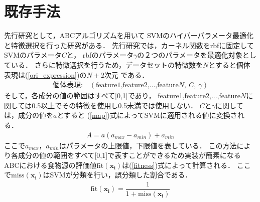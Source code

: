 \section{既存手法}
先行研究として，ABCアルゴリズムを用いて
SVMのハイパーパラメータ最適化と特徴選択を行った研究がある\cite{origin}．
先行研究では，カーネル関数をrbfに固定してSVMのパラメータ$C$と，
rbfのパラメータ$\gamma$の２つのパラメータを最適化対象としている．
さらに特徴選択を行うため，データセットの特徴数を$N$とすると個体表現は(\ref{ori_expression})の$N+2$次元
である．
\begin{align}
  \text{個体表現:} \quad  (\text{feature1,feature2,...,feature}N,~C,~\gamma)\label{ori_expression}
\end{align}
そして，各成分の値の範囲はすべて[0,1]であり，
feature1,feature2,...,feature$N$に関しては0.5以上でその特徴を使用し0.5未満では使用しない．
$C$と$\gamma$に関しては，成分の値を$a$とすると
(\ref{map})式によってSVMに適用される値に変換される．
\begin{align}
  \label{map}
  A =a(a_{max} -a_{min}) + a_{min}
\end{align}
ここで$a_{max}$，$a_{min}$はパラメータの上限値，下限値を表している．
この方法により各成分の値の範囲をすべて[0,1]で表すことができるため実装が簡素になる
ABCにおける食物源の評価値$\mathrm{fit}(\boldsymbol{x_{i}})$は(\ref{fitness})式によって計算される．
ここで$\mathrm{miss}(\boldsymbol{x_{i}})$はSVMが分類を行い，誤分類した割合である．
\begin{align}
    \label{fitness}
    \mathrm{fit}(\boldsymbol{x_{i}}) = \dfrac{1}{1+ \mathrm{miss}(\boldsymbol{x_{i}})}
\end{align}